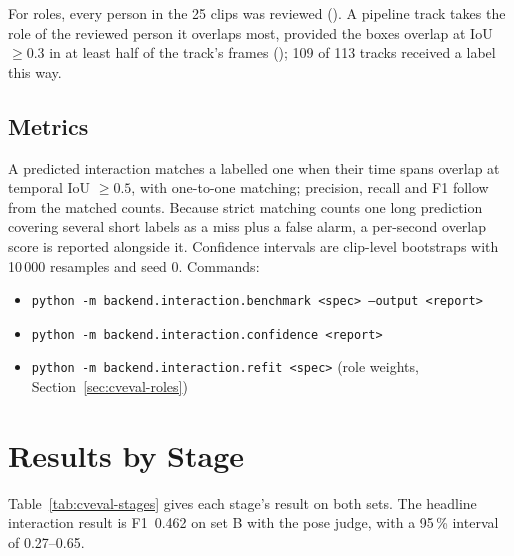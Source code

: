 For roles, every person in the 25 clips was reviewed (). A pipeline track takes the role of the reviewed person it overlaps most, provided the boxes overlap at IoU $\geq 0.3$ in at least half of the track's frames (); 109 of 113 tracks received a label this way.

\subsection{Metrics}
A predicted interaction matches a labelled one when their time spans overlap at temporal IoU $\geq 0.5$, with one-to-one matching; precision, recall and F1 follow from the matched counts. Because strict matching counts one long prediction covering several short labels as a miss plus a false alarm, a per-second overlap score is reported alongside it. Confidence intervals are clip-level bootstraps with 10\,000 resamples and seed 0. Commands:
\begin{itemize}
\item \texttt{python -m backend.interaction.benchmark <spec> --output <report>}
\item \texttt{python -m backend.interaction.confidence <report>}
\item \texttt{python -m backend.interaction.refit <spec>} (role weights, Section~\ref{sec:cveval-roles})
\end{itemize}

\section{Results by Stage}
\label{sec:cveval-results}
Table~\ref{tab:cveval-stages} gives each stage's result on both sets. The headline interaction result is F1~0.462 on set B with the pose judge, with a 95\,\% interval of 0.27--0.65.

